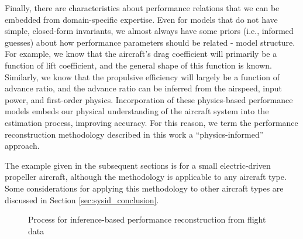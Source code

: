 Finally, there are characteristics about performance relations that we can be embedded from domain-specific expertise. Even for models that do not have simple, closed-form invariants, we almost always have some priors (i.e., informed guesses) about how performance parameters should be related - model structure. For example, we know that the aircraft's drag coefficient will primarily be a function of lift coefficient, and the general shape of this function is known. Similarly, we know that the propulsive efficiency will largely be a function of advance ratio, and the advance ratio can be inferred from the airspeed, input power, and first-order physics. Incorporation of these physics-based performance models embeds our physical understanding of the aircraft system into the estimation process, improving accuracy. For this reason, we term the performance reconstruction methodology described in this work a ``physics-informed'' approach.

The example given in the subsequent sections is for a small electric-driven propeller aircraft, although the methodology is applicable to any aircraft type. Some considerations for applying this methodology to other aircraft types are discussed in Section \ref{sec:sysid_conclusion}.

\begin{figure}[h]
    \centering
    \caption{Process for inference-based performance reconstruction from flight data}
    \label{fig:overall_procedure}
\end{figure}



